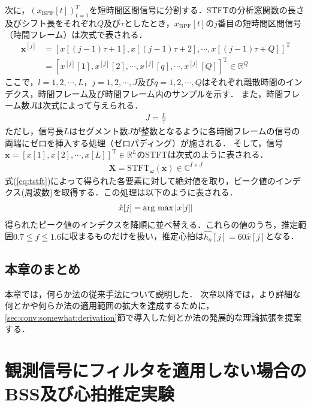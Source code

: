 次に，$\left(x_{\mathrm{BPF}}[t]\right)_{t=1}^{T}$を短時間区間信号に分割する．STFTの分析窓関数の長さ及びシフト長をそれぞれ$Q$及び$\tau$としたとき，$x_{\mathrm{BPF}}[t]$の$j$番目の短時間区間信号（時間フレーム）は次式で表される．
\begin{align}
  \nonumber \bm{x}^{[j]} &= \left[ x[(j-1)\tau +1], x[(j-1)\tau +2], \cdots, x[(j-1)\tau +Q] \right]^{\mathrm{T}} \\
  &=  [ x^{[j]} [1], x^{[j]} [2], \cdots, x^{[j]} [q], \cdots, x^{[j]} [Q] ]^{\mathrm{T}} \in \mathbb{R}^Q
\end{align}
ここで，$l =1, 2, \cdots, L$，$j=1, 2, \cdots, J$及び$q=1, 2, \cdots, Q$はそれぞれ離散時間のインデクス，時間フレーム及び時間フレーム内のサンプルを示す．
また，時間フレーム数$J$は次式によって与えられる．
\begin{align}
    J= \frac{L}{\tau}
\end{align}
ただし，信号長$L$はセグメント数$J$が整数となるように各時間フレームの信号の両端にゼロを挿入する処理（ゼロパディング）が施される．
そして，信号$\bm{x} = [ x[1], x[2], \cdots, x[L] ]^{\mathrm{T}}  \in \mathbb{R}^L$のSTFTは次式のように表される．
\begin{align}
    \bm{X} = \mathrm{STFT}_{\bm{\omega}}(\bm{x}) \in \mathbb{C}^{I \times J}  \label{eq:tstft}
\end{align}
式(\ref{eq:tstft})によって得られた各要素に対して絶対値を取り，ピーク値のインデクス(周波数)を取得する．この処理は以下のように表される．
\begin{align}
    \hat{x}[j]=\mathop{\mathrm{arg~max}}\limits|x[j]|  \label{eq:searchmax}
\end{align}
得られたピーク値のインデクスを降順に並べ替える．これらの値のうち，推定範囲$0.7\leqq f \leqq 1.6$に収まるものだけを扱い，推定心拍は$\hat{h_{o}}[j]=60\hat{x}[j]$となる．

\section{本章のまとめ}
本章では，何らか法の従来手法について説明した．
次章以降では，より詳細な何とかや何らか法の適用範囲の拡大を達成するために，
\ref{sec:conv:somewhat:derivation}節で導入した何とか法の発展的な理論拡張を提案する．


\chapter{観測信号にフィルタを適用しない場合のBSS及び心拍推定実験}
\label{chap:bsshrexp}

